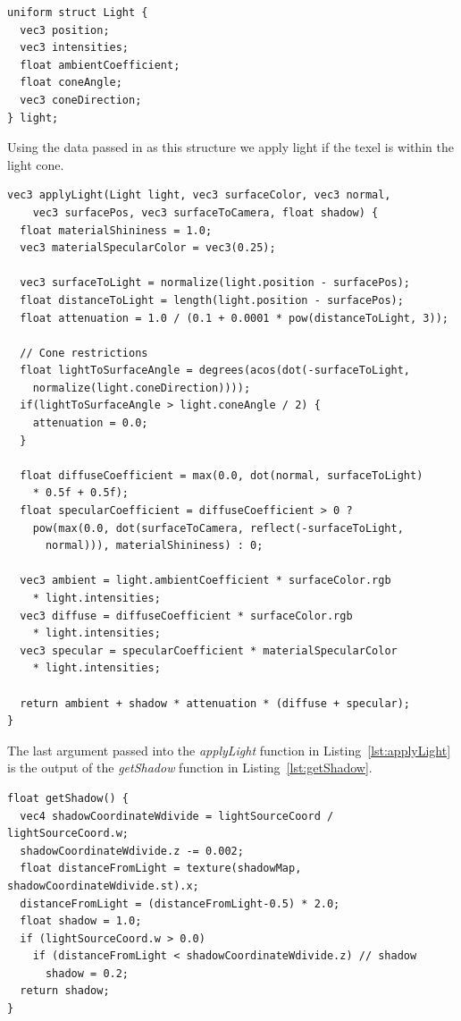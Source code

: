 \documentclass[a4paper,12pt]{article}
\begin{document}
\begin{lstlisting}[label=lst:shader-light-struct,caption= The light struct received in the shader.]
uniform struct Light {
  vec3 position;
  vec3 intensities;
  float ambientCoefficient;
  float coneAngle;
  vec3 coneDirection;
} light;
\end{lstlisting}

Using the data passed in as this structure we apply light if the texel is within the light cone.

\begin{lstlisting}[label=lst:applyLight,caption= Shader function for applying lighting]
vec3 applyLight(Light light, vec3 surfaceColor, vec3 normal,
    vec3 surfacePos, vec3 surfaceToCamera, float shadow) {
  float materialShininess = 1.0;
  vec3 materialSpecularColor = vec3(0.25);

  vec3 surfaceToLight = normalize(light.position - surfacePos);
  float distanceToLight = length(light.position - surfacePos);
  float attenuation = 1.0 / (0.1 + 0.0001 * pow(distanceToLight, 3));

  // Cone restrictions
  float lightToSurfaceAngle = degrees(acos(dot(-surfaceToLight,
    normalize(light.coneDirection))));
  if(lightToSurfaceAngle > light.coneAngle / 2) {
    attenuation = 0.0;
  }

  float diffuseCoefficient = max(0.0, dot(normal, surfaceToLight)
    * 0.5f + 0.5f);
  float specularCoefficient = diffuseCoefficient > 0 ?
    pow(max(0.0, dot(surfaceToCamera, reflect(-surfaceToLight,
      normal))), materialShininess) : 0;

  vec3 ambient = light.ambientCoefficient * surfaceColor.rgb
    * light.intensities;
  vec3 diffuse = diffuseCoefficient * surfaceColor.rgb
    * light.intensities;
  vec3 specular = specularCoefficient * materialSpecularColor
    * light.intensities;

  return ambient + shadow * attenuation * (diffuse + specular);
}
\end{lstlisting}

The last argument passed into the \emph{applyLight} function in Listing~\ref{lst:applyLight} is the output of the \emph{getShadow} function in Listing~\ref{lst:getShadow}.

\begin{lstlisting}[label=lst:getShadow,caption= The shader function figuring out whether the texel is in the shade.]
float getShadow() {
  vec4 shadowCoordinateWdivide = lightSourceCoord / lightSourceCoord.w;
  shadowCoordinateWdivide.z -= 0.002;
  float distanceFromLight = texture(shadowMap, shadowCoordinateWdivide.st).x;
  distanceFromLight = (distanceFromLight-0.5) * 2.0;
  float shadow = 1.0;
  if (lightSourceCoord.w > 0.0)
    if (distanceFromLight < shadowCoordinateWdivide.z) // shadow
      shadow = 0.2;
  return shadow;
}
\end{lstlisting}
\end{document}
